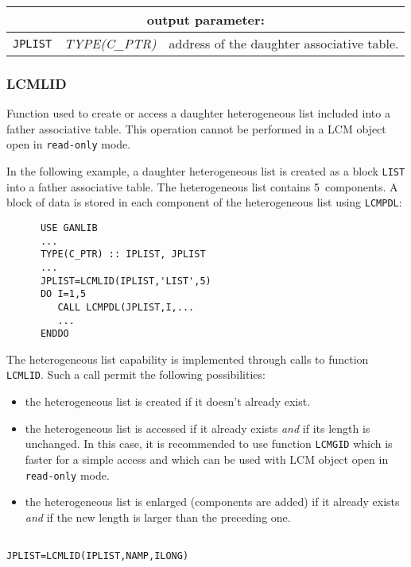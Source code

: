 \noindent
\begin{tabular}{|p{1.5cm}|p{3cm}|p{10cm}|}
\hline
\multicolumn{3}{|c|}{\bf output parameter:} \\
\hline
{\tt JPLIST} & {\it TYPE(C\_PTR)} & address of the daughter associative table. \\
\hline
\end{tabular}

\subsubsection{LCMLID}

Function used to create or access a daughter heterogeneous list included into a father associative table. This operation cannot be
performed in a LCM object open in {\tt read-only} mode.

\vskip 0.2cm

In the following example, a daughter heterogeneous list is created as a block {\tt LIST}
into a father associative table. The heterogeneous list contains 5~components. A block of data
is stored in each component of the heterogeneous list using {\tt LCMPDL}:

\begin{verbatim}
      USE GANLIB
      ...
      TYPE(C_PTR) :: IPLIST, JPLIST
      ...
      JPLIST=LCMLID(IPLIST,'LIST',5)
      DO I=1,5
         CALL LCMPDL(JPLIST,I,...
         ...
      ENDDO
\end{verbatim}

\vskip 0.2cm

The heterogeneous list capability is implemented through calls to function {\tt LCMLID}. Such a
call permit the following possibilities:
\begin{itemize}
\item the heterogeneous list is created if it doesn't already exist.
\item the heterogeneous list is accessed if it already exists {\sl and} if its length is unchanged. In this case,
it is recommended to use function {\tt LCMGID} which is faster for a simple access and which can be used
with LCM object open in {\tt read-only} mode.
\item the heterogeneous list is enlarged (components are added) if it already exists {\sl and} if the new length is larger than the preceding one.
\end{itemize}

\begin{verbatim}

JPLIST=LCMLID(IPLIST,NAMP,ILONG)
\end{verbatim}

